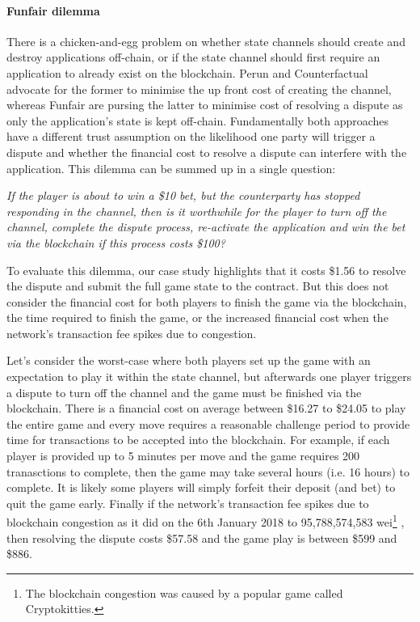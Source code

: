 \documentclass{llncs}
\begin{document}
	\paragraph{Funfair dilemma} 
	There is a chicken-and-egg problem on whether state channels should create and destroy applications off-chain, or if the state channel should first require an application to already exist on the blockchain. 
	Perun and Counterfactual advocate for the former to minimise the up front cost of creating the channel, whereas Funfair are pursing the latter to minimise cost of resolving a dispute as only the application's state is kept off-chain. 
	Fundamentally both approaches have a different trust assumption on the likelihood one party will trigger a dispute and whether the financial cost to resolve a dispute can interfere with the application. 
	This dilemma can be summed up in a single question:
	
	\begin{center}
		\textit{If the player is about to win a \$10 bet, but the counterparty has stopped responding in the channel, then is it worthwhile for the player to turn off the channel, complete the dispute process, re-activate the application and win the bet via the blockchain if this process costs \$100?} 
	\end{center} 
	
	To evaluate this dilemma, our case study highlights that it costs \$1.56 to resolve the dispute and submit the full game state to the contract.
	But this does not consider the financial cost for both players to finish the game via the blockchain, the time required to finish the game, or the increased financial cost when the network's transaction fee spikes due to congestion. %
	
	Let's consider the worst-case where both players set up the game with an expectation to play it within the state channel, but afterwards one player triggers a dispute to turn off the channel and the game must be finished via the blockchain.
	There is a financial cost on average between \$16.27 to \$24.05 to play the entire game and every move requires a reasonable challenge period to provide time for transactions to be accepted into the blockchain.
	For example, if each player is provided up to 5 minutes per move and the game requires 200 tranasctions to complete, then the game may take several hours (i.e. 16 hours) to complete. 
	It is likely some players will simply forfeit their deposit (and bet) to quit the game early. 
	Finally if the network's transaction fee spikes due to blockchain congestion as it did on the 6th January 2018 to 95,788,574,583 wei\footnote{The blockchain congestion was caused by a popular game called Cryptokitties.}  \cite{etherscan}, then resolving the dispute costs \$57.58 and the game play is between \$599 and \$886.  %
	
\end{document}
